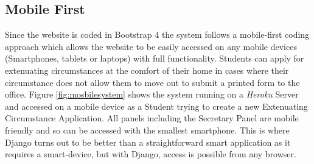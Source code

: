 \documentclass[../main.tex]{subfiles}
\begin{document}
\subsection*{Mobile First}
Since the website is coded in Bootstrap 4\cite{bootstrapfour} the system follows a mobile-first coding approach which allows the website to be easily accessed on any mobile devices (Smartphones, tablets or laptops) with full functionality. Students can apply for extenuating circumstances at the comfort of their home in cases where their circumstance does not allow them to move out to submit a printed form to the office. Figure \ref{fig:mosbilesystem} shows the system running on a \textit{Heroku} Server and accessed on a mobile device as a Student trying to create a new Extenuating Circumstance Application. All panels including the Secretary Panel are mobile friendly and so can be accessed with the smallest smartphone. This is where Django turns out to be better than a straightforward smart application as it requires a smart-device, but with Django, access is possible from any browser.
\end{document}
